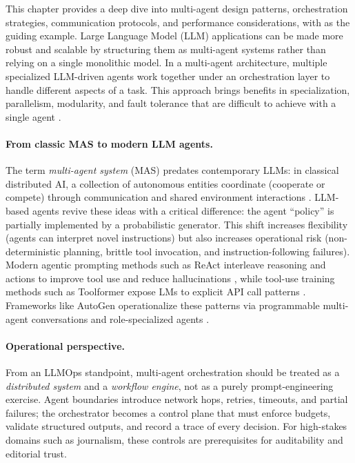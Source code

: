 This chapter provides a deep dive into multi-agent design patterns, orchestration strategies, communication protocols, and performance considerations, with \ishtar{} as the guiding example. Large Language Model (LLM) applications can be made more robust and scalable by structuring them as multi-agent systems rather than relying on a single monolithic model. In a multi-agent architecture, multiple specialized LLM-driven agents work together under an orchestration layer to handle different aspects of a task. This approach brings benefits in specialization, parallelism, modularity, and fault tolerance that are difficult to achieve with a single agent \cite{blogLangChain}.

\paragraph{From classic MAS to modern LLM agents.}
The term \emph{multi-agent system} (MAS) predates contemporary LLMs: in classical distributed AI, a collection of autonomous entities coordinate (cooperate or compete) through communication and shared environment interactions \cite{Wooldridge2009MultiAgent}.
LLM-based agents revive these ideas with a critical difference: the agent ``policy'' is partially implemented by a probabilistic generator.
This shift increases flexibility (agents can interpret novel instructions) but also increases operational risk (non-deterministic planning, brittle tool invocation, and instruction-following failures).
Modern agentic prompting methods such as ReAct interleave reasoning and actions to improve tool use and reduce hallucinations \cite{Yao2022ReAct}, while tool-use training methods such as Toolformer expose LMs to explicit API call patterns \cite{Schick2023Toolformer}.
Frameworks like AutoGen operationalize these patterns via programmable multi-agent conversations and role-specialized agents \cite{Wu2023AutoGen}.

\paragraph{Operational perspective.}
From an LLMOps standpoint, multi-agent orchestration should be treated as a \emph{distributed system} and a \emph{workflow engine}, not as a purely prompt-engineering exercise.
Agent boundaries introduce network hops, retries, timeouts, and partial failures; the orchestrator becomes a control plane that must enforce budgets, validate structured outputs, and record a trace of every decision.
For high-stakes domains such as journalism, these controls are prerequisites for auditability and editorial trust.

